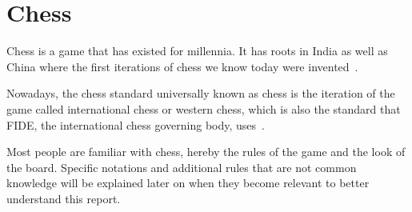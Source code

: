 \section{Chess}\label{sec:chess}

Chess is a game that has existed for millennia.
It has roots in India as well as China where the first iterations of chess we know today were
invented~\cite{murray1913}.

Nowadays, the chess standard universally known as chess is the iteration of the game called international chess or
western chess, which is also the standard that FIDE, the international chess governing body, uses~\cite{fide2024}.

Most people are familiar with chess, hereby the rules of the game and the look of the board.
Specific notations and additional rules that are not common knowledge will be explained later on
when they become relevant to better understand this report.
